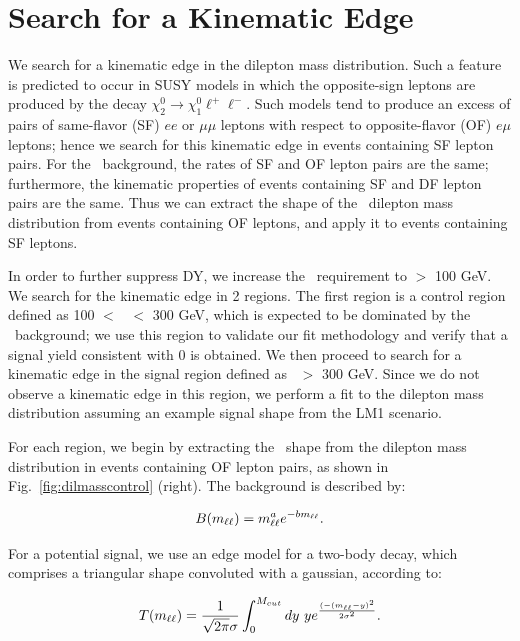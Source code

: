 \section{Search for a Kinematic Edge}
\label{sec:fit}

We search for a kinematic edge in the dilepton mass distribution. Such a feature is 
predicted to occur in SUSY models in which the opposite-sign leptons are produced by the
decay $\chi_2^0 \to \chi_1^0 \ell^+\ell^-$. Such models tend to produce an excess of pairs 
of same-flavor (SF) $ee$ or $\mu\mu$ leptons with respect to opposite-flavor (OF) $e\mu$
leptons; hence we search for this kinematic edge in events containing SF lepton pairs. 
For the \ttbar\ background, the rates of SF and OF lepton pairs are the same;
furthermore, the kinematic properties of events containing SF and DF lepton pairs are the
same. Thus we can extract the shape of the \ttbar\ dilepton mass distribution from events 
containing OF leptons, and apply it to events containing SF leptons.

In order to further suppress DY, we increase the \MET\ requirement to \MET $>$ 100 GeV. 
We search for the kinematic edge in 2 regions.  The first region is a control region defined
as 100 $<$ \Ht\ $<$ 300 GeV, which is expected to be dominated by the \ttbar\ background; we use 
this region to validate our fit methodology and verify that a signal yield consistent with 0 
is obtained. We then proceed to search for a kinematic edge in the signal region defined as 
\Ht\ $>$ 300 GeV. Since we do not observe a kinematic edge in this region, we perform a 
fit to the dilepton mass distribution assuming an example signal shape from the LM1 scenario.

For each region, we begin by extracting the \ttbar\ shape from the dilepton mass distribution 
in events containing OF lepton pairs, as shown in Fig.~\ref{fig:dilmasscontrol} (right). 
The background is described by:

\begin{equation}
B(m_{\ell\ell}) = m_{\ell\ell}^a e^{-b m_{\ell\ell}}.
\end{equation}

For a potential signal, we use an edge model for a two-body decay, which comprises a triangular shape convoluted with a gaussian,
according to:

\begin{equation}
T(m_{\ell\ell}) = \frac{1}{\sqrt{2\pi}\sigma}\int_0^{M_{cut}} dy~y e^{\frac{(-(m_{\ell\ell}-y)^2}{2\sigma^2}}. 
\end{equation}

